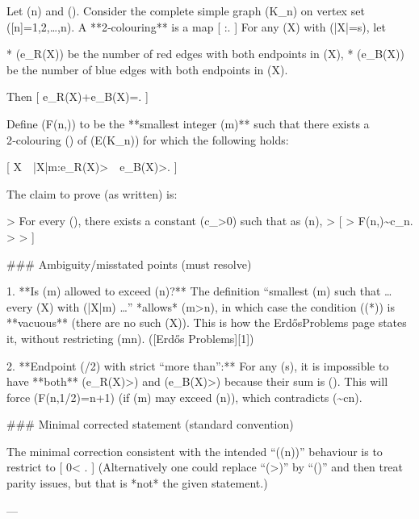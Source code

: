 Let (n\in{}) and (\alpha\in[0,1/2]). Consider the complete simple graph (K_n) on vertex set ([n]={1,2,\dots,n}). A **2‑colouring** is a map
[
\chi:.
]
For any (X\subseteq[n]) with (|X|=s), let

* (e_R(X)) be the number of red edges with both endpoints in (X),
* (e_B(X)) be the number of blue edges with both endpoints in (X).

Then
[
e_R(X)+e_B(X)=.
]

Define (F(n,\alpha)) to be the **smallest integer (m)** such that there exists a 2‑colouring (\chi) of (E(K_n)) for which the following holds:

[
\forall X\subseteq[n]\ \ |X|\ge m:\quad e_R(X)>\alpha{}\ \ e_B(X)>\alpha{}.
\tag{(*)}
]

The claim to prove (as written) is:

> For every (\alpha\in[0,1/2]), there exists a constant (c_\alpha>0) such that as (n\to\infty),
> [
> F(n,\alpha)\sim c_\alpha\log n.
> 
> ]

### Ambiguity/misstated points (must resolve)

1. **Is (m) allowed to exceed (n)?**
The definition “smallest (m) such that … every (X\subseteq[n]) with (|X|\ge m) …” *allows* (m>n), in which case the condition ((*)) is **vacuous** (there are no such (X)).
This is how the ErdősProblems page states it, without restricting (m\le n). ([Erdős Problems][1])

2. **Endpoint (/2) with strict “more than”:**
For any (s), it is impossible to have **both** (e_R(X)>) and (e_B(X)>) because their sum is ().
This will force (F(n,1/2)=n+1) (if (m) may exceed (n)), which contradicts (\sim c\log n).

### Minimal corrected statement (standard convention)

The minimal correction consistent with the intended “(\Theta(\log n))” behaviour is to restrict to
[
0\le \alpha < .
]
(Alternatively one could replace “(>)” by “(\ge)” and then treat parity issues, but that is *not* the given statement.)

---
